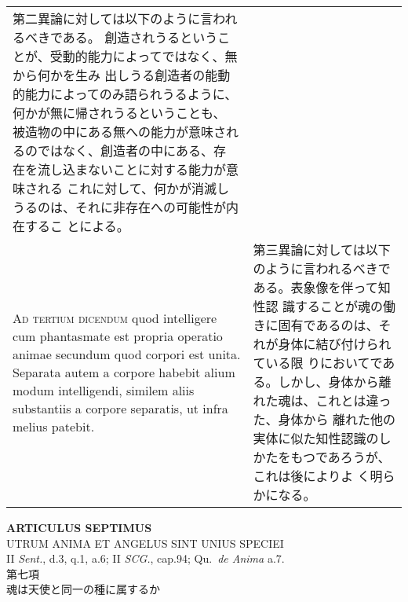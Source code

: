\documentclass[paper=a4paper,fontsize=10pt,jafontsize=9pt,titlepage]{jlreq}
\begin{document}
\begin{longtable}{p{21em}p{21em}}
第二異論に対しては以下のように言われるべきである。
創造されうるということが、受動的能力によってではなく、無から何かを生み
 出しうる創造者の能動的能力によってのみ語られうるように、何かが無に帰されうるということも、
被造物の中にある無への能力が意味されるのではなく、創造者の中にある、存
 在を流し込まないことに対する能力が意味される
これに対して、何かが消滅しうるのは、それに非存在への可能性が内在するこ
 とによる。

\\



{\scshape Ad tertium dicendum} quod intelligere cum phantasmate est
propria operatio animae secundum quod corpori est unita. Separata
autem a corpore habebit alium modum intelligendi, similem aliis
substantiis a corpore separatis, ut infra melius patebit.


&

第三異論に対しては以下のように言われるべきである。表象像を伴って知性認
識することが魂の働きに固有であるのは、それが身体に結び付けられている限
りにおいてである。しかし、身体から離れた魂は、これとは違った、身体から
離れた他の実体に似た知性認識のしかたをもつであろうが、これは後によりよ
く明らかになる。





\\

\end{longtable}
\newpage

\begin{center}
{\Large {\bfseries ARTICULUS SEPTIMUS}}\\
{\large UTRUM ANIMA ET ANGELUS SINT UNIUS SPECIEI}\\
{\footnotesize II {\itshape Sent.}, d.3, q.1, a.6; II {\itshape SCG.},
 cap.94; Qu.~{\itshape de Anima} a.7.}\\
{\Large 第七項\\魂は天使と同一の種に属するか}
\end{center}
\end{document}
